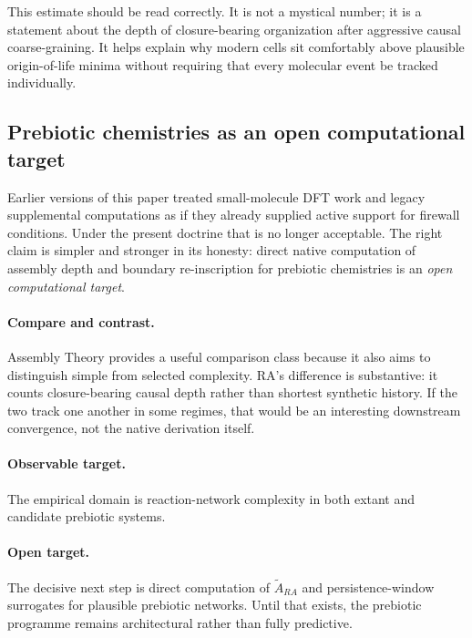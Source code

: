 \documentclass[11pt]{article}
\def\mathrm#1{#1}%
\begin{document}
This estimate should be read correctly. It is not a mystical number; it is a statement about the depth of closure-bearing organization after aggressive causal coarse-graining. It helps explain why modern cells sit comfortably above plausible origin-of-life minima without requiring that every molecular event be tracked individually.

\subsection{Prebiotic chemistries as an open computational target}

Earlier versions of this paper treated small-molecule DFT work and legacy supplemental computations as if they already supplied active support for firewall conditions. Under the present doctrine that is no longer acceptable. The right claim is simpler and stronger in its honesty: direct native computation of assembly depth and boundary re-inscription for prebiotic chemistries is an \emph{open computational target}.

\paragraph{Compare and contrast.} Assembly Theory \cite{Sharma2023} provides a useful comparison class because it also aims to distinguish simple from selected complexity. RA's difference is substantive: it counts closure-bearing causal depth rather than shortest synthetic history. If the two track one another in some regimes, that would be an interesting downstream convergence, not the native derivation itself.

\paragraph{Observable target.} The empirical domain is reaction-network complexity in both extant and candidate prebiotic systems.

\paragraph{Open target.} The decisive next step is direct computation of $\tilde{A}_{\mathrm{RA}}$ and persistence-window surrogates for plausible prebiotic networks. Until that exists, the prebiotic programme remains architectural rather than fully predictive.

\end{document}
